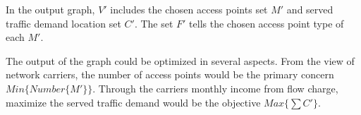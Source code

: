 In the output graph, $V'$ includes the chosen access points set $M'$ and served 
traffic demand location set $C'$. The set $F'$ tells the chosen access point 
type of each $M'$. 

% 

The output of the graph could be optimized in several aspects. From the view of network carriers,
the number of access points would be the primary concern $Min{\{Number\{M'\}\}}$.
Through the carriers monthly income from flow charge, maximize the served traffic
demand would be the objective $Max{\{\sum{C'}\}}$. 

